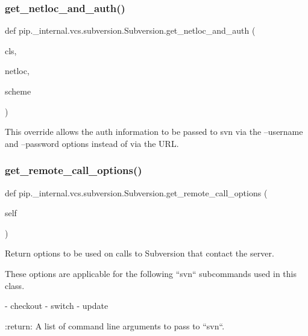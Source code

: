\subsubsection{\texorpdfstring{get\+\_\+netloc\+\_\+and\+\_\+auth()}{get\_netloc\_and\_auth()}}
{\footnotesize\ttfamily def pip.\+\_\+internal.\+vcs.\+subversion.\+Subversion.\+get\+\_\+netloc\+\_\+and\+\_\+auth (\begin{DoxyParamCaption}\item[{}]{cls,  }\item[{}]{netloc,  }\item[{}]{scheme }\end{DoxyParamCaption})}

\begin{DoxyVerb}This override allows the auth information to be passed to svn via the
--username and --password options instead of via the URL.
\end{DoxyVerb}
 \mbox{\label{classpip_1_1__internal_1_1vcs_1_1subversion_1_1Subversion_a894ac76a60631cd377d58eec97f92772}} 
\subsubsection{\texorpdfstring{get\+\_\+remote\+\_\+call\+\_\+options()}{get\_remote\_call\_options()}}
{\footnotesize\ttfamily def pip.\+\_\+internal.\+vcs.\+subversion.\+Subversion.\+get\+\_\+remote\+\_\+call\+\_\+options (\begin{DoxyParamCaption}\item[{}]{self }\end{DoxyParamCaption})}

\begin{DoxyVerb}Return options to be used on calls to Subversion that contact the server.

These options are applicable for the following ``svn`` subcommands used
in this class.

    - checkout
    - switch
    - update

:return: A list of command line arguments to pass to ``svn``.
\end{DoxyVerb}
 \mbox{\label{classpip_1_1__internal_1_1vcs_1_1subversion_1_1Subversion_afdb927f50e790e769ca5f5db12dbdbd6}} 
